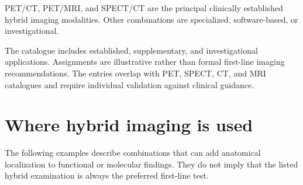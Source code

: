 PET/CT, PET/MRI, and SPECT/CT are the principal clinically established hybrid imaging modalities. Other combinations are specialized, software-based, or investigational.

The catalogue includes established, supplementary, and investigational applications. Assignments are illustrative rather than formal first-line imaging recommendations. The entries overlap with PET, SPECT, CT, and MRI catalogues and require individual validation against clinical guidance.

\section{Where hybrid imaging is used}
The following examples describe combinations that can add anatomical localization to functional or molecular findings. They do not imply that the listed hybrid examination is always the preferred first-line test.

